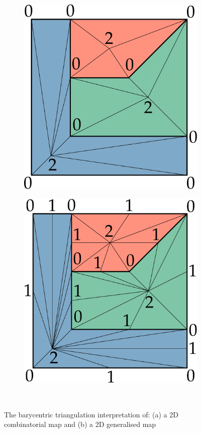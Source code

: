 \begin{figure}
\centering
\begin{subfigure}{0.3\linewidth}
\includegraphics[width=\linewidth]{figs/cmaps-simplices}
\caption{}%
\label{subfig:cmaps-simplices}
\end{subfigure}
\quad
\begin{subfigure}{0.3\linewidth}
\includegraphics[width=\linewidth]{figs/gmaps-simplices}
\caption{}%
\label{subfig:gmaps-simplices}
\end{subfigure}\\
\caption{The barycentric triangulation interpretation of: (a) a 2D combinatorial map and (b) a 2D generalised map}%
\label{fig:maps-simplices}
\end{figure}

